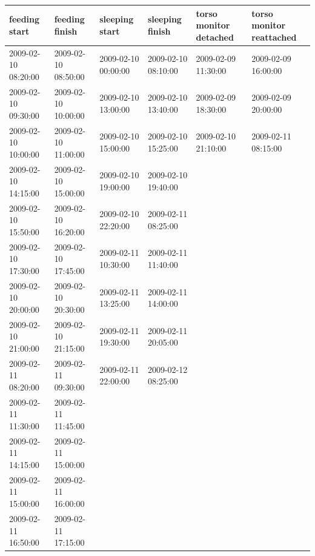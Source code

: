 \documentclass{article}
\begin{document}
{\begin{table}[h]\tiny
\begin{tabular}{|l|l|l|l|l|l|}
\hline
feeding start       & feeding finish      & sleeping start      & sleeping finish     & torso monitor detached & torso monitor reattached \\ \hline
2009-02-10 08:20:00 & 2009-02-10 08:50:00 & 2009-02-10 00:00:00 & 2009-02-10 08:10:00 & 2009-02-09 11:30:00    & 2009-02-09 16:00:00 \\ \hline
2009-02-10 09:30:00 & 2009-02-10 10:00:00 & 2009-02-10 13:00:00 & 2009-02-10 13:40:00 & 2009-02-09 18:30:00    & 2009-02-09 20:00:00 \\ \hline
2009-02-10 10:00:00 & 2009-02-10 11:00:00 & 2009-02-10 15:00:00 & 2009-02-10 15:25:00 & 2009-02-10 21:10:00    & 2009-02-11 08:15:00 \\ \hline
2009-02-10 14:15:00 & 2009-02-10 15:00:00 & 2009-02-10 19:00:00 & 2009-02-10 19:40:00 &                        &                     \\ \hline
2009-02-10 15:50:00 & 2009-02-10 16:20:00 & 2009-02-10 22:20:00 & 2009-02-11 08:25:00 &                        &                     \\ \hline
2009-02-10 17:30:00 & 2009-02-10 17:45:00 & 2009-02-11 10:30:00 & 2009-02-11 11:40:00 &                        &                     \\ \hline
2009-02-10 20:00:00 & 2009-02-10 20:30:00 & 2009-02-11 13:25:00 & 2009-02-11 14:00:00 &                        &                     \\ \hline
2009-02-10 21:00:00 & 2009-02-10 21:15:00 & 2009-02-11 19:30:00 & 2009-02-11 20:05:00 &                        &                     \\ \hline
2009-02-11 08:20:00 & 2009-02-11 09:30:00 & 2009-02-11 22:00:00 & 2009-02-12 08:25:00 &                        &                     \\ \hline
2009-02-11 11:30:00 & 2009-02-11 11:45:00 &                     &                     &                        &                     \\ \hline
2009-02-11 14:15:00 & 2009-02-11 15:00:00 &                     &                     &                        &                     \\ \hline
2009-02-11 15:00:00 & 2009-02-11 16:00:00 &                     &                     &                        &                     \\ \hline
2009-02-11 16:50:00 & 2009-02-11 17:15:00 &                     &                     &                        &                     \\ \hline

\end{tabular}
\end{table}}
\end{document}
